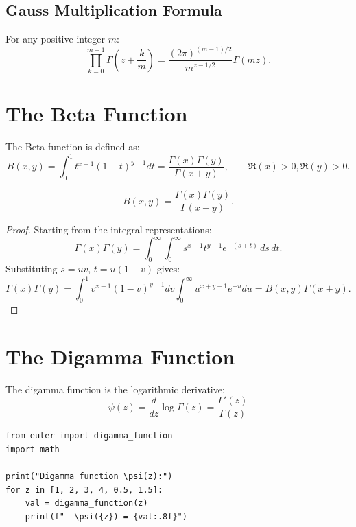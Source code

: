 \subsection{Gauss Multiplication Formula}

\begin{theorem}
For any positive integer $m$:
\[
\prod_{k=0}^{m-1} \Gamma\left(z + \frac{k}{m}\right) = \frac{(2\pi)^{(m-1)/2}}{m^{z-1/2}} \Gamma(mz).
\]
\end{theorem}

\section{The Beta Function}

\begin{definition}
The Beta function is defined as:
\[
B(x, y) = \int_0^1 t^{x-1}(1-t)^{y-1} dt = \frac{\Gamma(x)\Gamma(y)}{\Gamma(x+y)}, \qquad \Re(x) > 0, \Re(y) > 0.
\]
\end{definition}

\begin{theorem}
\[
B(x, y) = \frac{\Gamma(x)\Gamma(y)}{\Gamma(x+y)}.
\]
\end{theorem}

\begin{proof}
Starting from the integral representations:
\[
\Gamma(x)\Gamma(y) = \int_0^\infty \int_0^\infty s^{x-1} t^{y-1} e^{-(s+t)}\, ds\, dt.
\]
Substituting $s = uv$, $t = u(1-v)$ gives:
\[
\Gamma(x)\Gamma(y) = \int_0^1 v^{x-1}(1-v)^{y-1} dv \int_0^\infty u^{x+y-1} e^{-u} du = B(x,y) \Gamma(x+y).
\]
\end{proof}

\section{The Digamma Function}

The digamma function is the logarithmic derivative:
\[
\psi(z) = \frac{d}{dz} \log \Gamma(z) = \frac{\Gamma'(z)}{\Gamma(z)}
\]

\begin{lstlisting}[caption={Digamma function}, label=lst:digamma]
from euler import digamma_function
import math

print("Digamma function \psi(z):")
for z in [1, 2, 3, 4, 0.5, 1.5]:
    val = digamma_function(z)
    print(f"  \psi({z}) = {val:.8f}")
\end{lstlisting}

